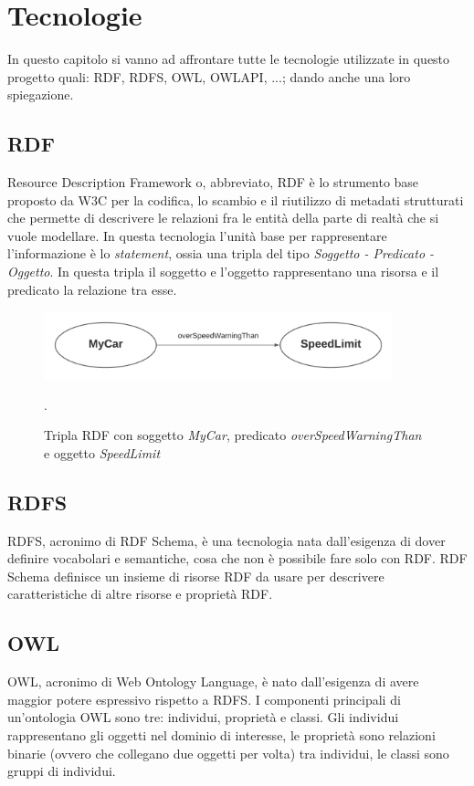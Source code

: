 \chapter{Tecnologie}
In questo capitolo si vanno ad affrontare tutte le tecnologie utilizzate in questo progetto quali: RDF, RDFS, OWL, OWLAPI, ...; dando anche una loro spiegazione.
\section{RDF}
Resource Description Framework o, abbreviato, RDF \`e lo strumento base proposto da W3C per la codifica, lo scambio e il riutilizzo di metadati strutturati che permette di descrivere le relazioni fra le entit\`a della parte di realt\`a che si vuole modellare.
In questa tecnologia l'unit\`a base per rappresentare l'informazione \`e lo \textit{statement}, ossia una tripla del tipo \textit{Soggetto - Predicato - Oggetto}.
In questa tripla il soggetto e l'oggetto rappresentano una risorsa e il predicato la relazione tra esse. \cite{rdf}

\begin{figure}[h!]
    \centering
    \includegraphics[width=0.90\textwidth]{img/overSpeedWarningThanRDF.png}
   	\caption{Tripla RDF con soggetto \textit{MyCar}, predicato \textit{overSpeedWarningThan} e oggetto \textit{SpeedLimit}}.
	\label{fig:triplaRDF}
\end{figure}

\section{RDFS}
RDFS, acronimo di RDF Schema, \`e una tecnologia nata dall'esigenza di dover definire vocabolari e semantiche, cosa che non \`e possibile fare solo con RDF.
RDF Schema definisce un insieme di risorse RDF da usare per descrivere caratteristiche di altre risorse e propriet\`a RDF. \cite{rdfs}

\section{OWL}
OWL, acronimo di Web Ontology Language, \`e nato dall'esigenza di avere maggior potere espressivo rispetto a RDFS.
I componenti principali di un'ontologia OWL sono tre: individui, propriet\`a e classi. Gli individui rappresentano gli oggetti nel dominio di interesse, le propriet\`a sono relazioni binarie (ovvero che collegano due oggetti per volta) tra individui, le classi sono gruppi di individui.
\cite{owl}

